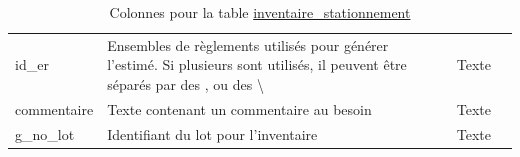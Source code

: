\begin{table}[h]
\begin{tabular}{m{}|m{}m{}m{}}
            id\_er & Ensembles de règlements utilisés pour générer l'estimé. Si plusieurs sont utilisés, il peuvent être séparés par des , ou des \textbackslash & Texte & \\ 
            commentaire & Texte contenant un commentaire au besoin & Texte & \\ 
            g\_no\_lot & Identifiant du lot pour l'inventaire & Texte & \\
            \hline
       \end{tabular}
       \caption{Colonnes pour la table \underline{inventaire\_stationnement}}
       \label{tab:definition_table_inventaire}
   \end{table}\par
